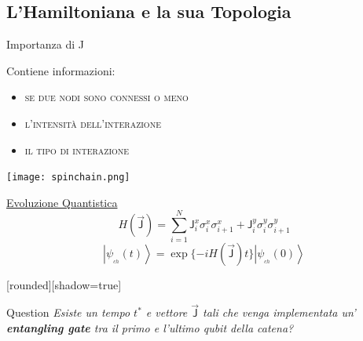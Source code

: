 \documentclass[xcolor=x11names,compress]{beamer}
\renewcommand{\(}{\begin{columns}}
\renewcommand{\)}{\end{columns}}
\newcommand{\<}[1]{\begin{column}{#1}}
\renewcommand{\>}{\end{column}}
\begin{document}
\subsection{L'Hamiltoniana e la sua Topologia}
\begin{frame}{Importanza di \textsf{J}}

Contiene informazioni: 
\begin{itemize}
  \item \textsc{se due nodi sono connessi o meno} 
  \item \textsc{l'intensità dell'interazione}
  \item \textsc{il tipo di interazione}
\end{itemize}

\begin{example}

\begin{center}
\texttt{[image: spinchain.png]}
\end{center}

\begin{multicols}{2}


\textcolor{myred}{\small{\underline{Evoluzione Quantistica}}} 
\small{$$H(\vec{\textsf{J}}) = \sum_{i=1}^N \textsf{J}^x_{i} \sigma_i^x \sigma_{i+1}^x  +  \textsf{J}^y_{i} \sigma_i^y \sigma_{i+1}^y$$ 
$$\left| \psi_{_{ch}} (t) \right\rangle = \exp \{ - i H(\vec{\textsf{J}}) t  \} \left| \psi_{_{ch}} (0) \right\rangle$$ }

\columnbreak
\vspace{-0.1cm}
\begin{minipage}{0.5\textwidth}
[rounded][shadow=true]
\begin{block}{\textcolor{myred}{Question}}
\textit{\small{Esiste un tempo $t^*$ e vettore $\vec{\textsf{J}}$ tali che venga implementata un' \textbf{entangling gate} tra il primo e l'ultimo qubit della catena?}}
\end{block}

\end{minipage}

\end{multicols}


\end{example}


\end{frame}


\end{document}
